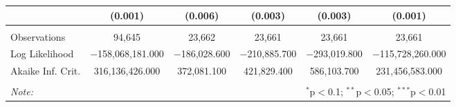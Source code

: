 \begin{table}[!htbp]
\begin{tabular}{@{\extracolsep{5pt}}lccccc}
  & (0.001) & (0.006) & (0.003) & (0.003) & (0.001) \\ 
 \hline \\[-1.8ex] 
Observations & 94,645 & 23,662 & 23,661 & 23,661 & 23,661 \\ 
Log Likelihood & $-$158,068,181.000 & $-$186,028.600 & $-$210,885.700 & $-$293,019.800 & $-$115,728,260.000 \\ 
Akaike Inf. Crit. & 316,136,426.000 & 372,081.100 & 421,829.400 & 586,103.700 & 231,456,583.000 \\ 
\hline 
\hline \\[-1.8ex] 
\textit{Note:}  & \multicolumn{5}{r}{$^{*}$p$<$0.1; $^{**}$p$<$0.05; $^{***}$p$<$0.01} \\ 
\end{tabular} 
\end{table} 
